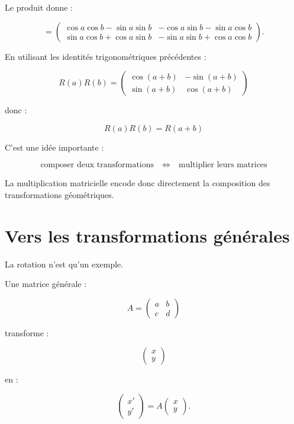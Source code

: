 \documentclass[11pt,a4paper]{article}
\newcommand{\sectiontitle}[1]{
    \section{#1}
}
\begin{document}
Le produit donne :

\[
=
\begin{pmatrix}
\cos a\cos b-\sin a\sin b
&
-\cos a\sin b-\sin a\cos b
\\
\sin a\cos b+\cos a\sin b
&
-\sin a\sin b+\cos a\cos b
\end{pmatrix}.
\]

En utilisant les identités trigonométriques précédentes :

\[
\boxed{
R(a)R(b)=
\begin{pmatrix}
\cos(a+b)&-\sin(a+b)\\
\sin(a+b)&\cos(a+b)
\end{pmatrix}
}
\]

donc :

\[
\boxed{
R(a)R(b)=R(a+b)
}
\]

C'est une idée importante :

\begin{importantbox}

\[
\boxed{
\text{composer deux transformations}
\quad\Longleftrightarrow\quad
\text{multiplier leurs matrices}
}
\]

\end{importantbox}

La multiplication matricielle encode donc directement la composition
des transformations géométriques.


\sectiontitle{Vers les transformations générales}

La rotation n'est qu'un exemple.

Une matrice générale :

\[
A=
\begin{pmatrix}
a&b\\
c&d
\end{pmatrix}
\]

transforme :

\[
\begin{pmatrix}
x\\
y
\end{pmatrix}
\]

en :

\[
\begin{pmatrix}
x'\\
y'
\end{pmatrix}
=
A
\begin{pmatrix}
x\\
y
\end{pmatrix}.
\]
\end{document}

